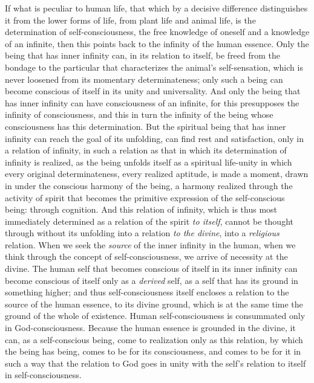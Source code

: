 \documentclass[12pt,a4paper,openany]{book}
\newcommand{\opage}[1]{\marginnote{\footnotesize\textit{[#1]}}}
\begin{document}
If what is peculiar to human life, that which by a decisive
difference distinguishes it from the lower forms of life, from plant
life and animal life, is the determination of self-consciousness, the
free knowledge of oneself and a knowledge of an infinite, then this
points back to the infinity of the human essence. Only the being that
has inner infinity can, in its relation to itself, be freed from the
bondage to the particular that characterizes the animal's
self-sensation, which is never loosened from its momentary
determinateness; only such a being can become conscious of itself in
its unity and universality. And only the being that has inner
infinity can have consciousness of an infinite, for this presupposes
the infinity of consciousness, and this in turn the infinity of the
being whose consciousness has this determination. But the spiritual
being that has inner infinity can reach the goal of its unfolding,
can find rest and satisfaction, only in a relation of infinity, in
such a relation as that in which its determination of infinity is
realized, as the being unfolds itself as a spiritual life-unity in
which every original determinateness, every realized aptitude, is
made a moment, drawn in under
\opage{499}the conscious harmony of the being, a harmony realized through
the activity of spirit that becomes the primitive expression of the
self-conscious being: through cognition. And this relation of
infinity, which is thus most immediately determined as a relation of
the spirit \emph{to itself}, cannot be thought through without its
unfolding into a relation \emph{to the divine}, into a \emph{religious}
relation. When we seek the \emph{source} of the inner infinity in the
human, when we think through the concept of self-consciousness, we
arrive of necessity at the divine. The human self that becomes
conscious of itself in its inner infinity can become conscious of
itself only as a \emph{derived} self, as a self that has its ground in
something higher; and thus self-consciousness itself encloses a
relation to the source of the human essence, to its divine ground,
which is at the same time the ground of the whole of existence. Human
self-consciousness is consummated only in God-consciousness. Because
the human essence is grounded in the divine, it can, as a
self-conscious being, come to realization only as this relation, by
which the being has being, comes to be for its consciousness, and
comes to be for it in such a way that the relation to God goes in
unity with the self's relation to itself in self-consciousness.
\end{document}
